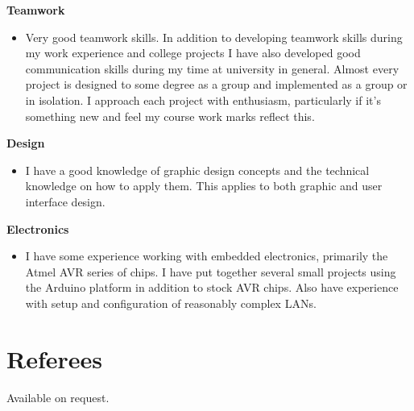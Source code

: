 \documentclass{res}
\begin{document}
\begin{resume}
    {\bf  Teamwork} 
        \begin{itemize}
        \item[]  Very good teamwork skills. In addition to developing teamwork skills during my work experience and college projects I have also developed good communication skills during my time at university in general. Almost every project is designed to some degree as a group and implemented as a group or in isolation. I approach each project with enthusiasm, particularly if it's something new and feel my course work marks reflect this.
       \end{itemize} 

  {\bf Design} 
        \begin{itemize}
        \item[] I have a good knowledge of graphic design concepts and the technical knowledge on how to apply them. This applies to both graphic and user interface design.
       \end{itemize}

   {\bf  Electronics} 
        \begin{itemize}
        \item[]  I have some experience working with embedded electronics, primarily the Atmel AVR series of chips. I have put together several small projects using the Arduino platform in addition to stock AVR chips. Also have experience with setup and configuration of reasonably complex LANs.
       \end{itemize} 

 
\section{Referees}
\vspace{0.1in} 
 
   Available on request.
    
 

\end{resume}
\end{document}
